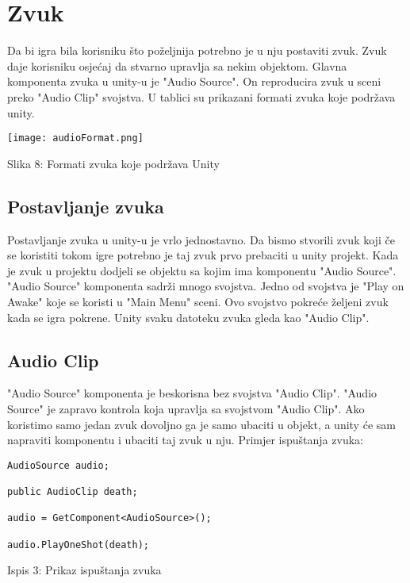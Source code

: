 \section{Zvuk}

Da bi igra bila korisniku što poželjnija potrebno je u nju postaviti zvuk. Zvuk daje korisniku osjećaj da stvarno upravlja sa nekim objektom. Glavna komponenta zvuka u unity-u je "Audio Source". On reproducira zvuk u sceni preko "Audio Clip" svojstva. U tablici su prikazani formati zvuka koje podržava unity.  


\begin{center}
	\texttt{[image: audioFormat.png]}
	
	
	Slika 8: Formati zvuka koje podržava Unity
\end{center}


\subsection{Postavljanje zvuka}
Postavljanje zvuka u unity-u je vrlo jednostavno. Da bismo stvorili zvuk koji če se koristiti tokom igre potrebno je taj zvuk prvo prebaciti u unity projekt. Kada je zvuk u projektu dodjeli se objektu sa kojim ima komponentu "Audio Source". "Audio Source" komponenta sadrži mnogo svojstva. Jedno od svojstva je "Play on Awake" koje se koristi u "Main Menu" sceni. Ovo svojstvo pokreće željeni zvuk kada se igra pokrene. Unity svaku datoteku zvuka gleda kao "Audio Clip".

\subsection{Audio Clip}
"Audio Source" komponenta je beskorisna bez svojstva "Audio Clip". "Audio Source" je zapravo kontrola koja upravlja sa svojstvom "Audio Clip". Ako koristimo samo jedan zvuk dovoljno ga je samo ubaciti u objekt, a unity će sam napraviti komponentu i ubaciti taj zvuk u nju.
\newpage
Primjer ispuštanja zvuka:


\begin{verbatim}
AudioSource audio;

public AudioClip death;

audio = GetComponent<AudioSource>();

audio.PlayOneShot(death);

\end{verbatim}
\begin{center}
	
	Ispis 3: Prikaz ispuštanja zvuka
\end{center}

